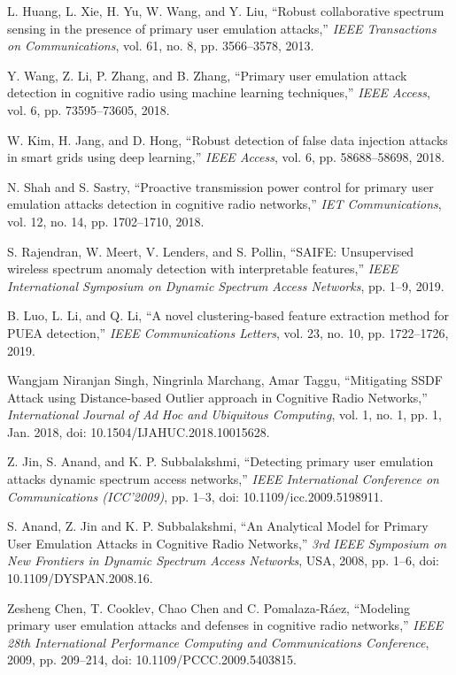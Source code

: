\documentclass[pdflatex,sn-mathphys-num]{sn-jnl}%
\theoremstyle{thmstyleone}
\theoremstyle{thmstyletwo}
\theoremstyle{thmstylethree}
\begin{document}
\begin{thebibliography}{25}
L. Huang, L. Xie, H. Yu, W. Wang, and Y. Liu, ``Robust collaborative spectrum sensing in the presence of primary user emulation attacks,'' \emph{IEEE Transactions on Communications}, vol. 61, no. 8, pp. 3566--3578, 2013.

Y. Wang, Z. Li, P. Zhang, and B. Zhang, ``Primary user emulation attack detection in cognitive radio using machine learning techniques,'' \emph{IEEE Access}, vol. 6, pp. 73595--73605, 2018.

W. Kim, H. Jang, and D. Hong, ``Robust detection of false data injection attacks in smart grids using deep learning,'' \emph{IEEE Access}, vol. 6, pp. 58688--58698, 2018.

N. Shah and S. Sastry, ``Proactive transmission power control for primary user emulation attacks detection in cognitive radio networks,'' \emph{IET Communications}, vol. 12, no. 14, pp. 1702--1710, 2018.

S. Rajendran, W. Meert, V. Lenders, and S. Pollin, ``SAIFE: Unsupervised wireless spectrum anomaly detection with interpretable features,'' \emph{IEEE International Symposium on Dynamic Spectrum Access Networks}, pp. 1--9, 2019.

B. Luo, L. Li, and Q. Li, ``A novel clustering-based feature extraction method for PUEA detection,'' \emph{IEEE Communications Letters}, vol. 23, no. 10, pp. 1722--1726, 2019.

Wangjam Niranjan Singh, Ningrinla Marchang, Amar Taggu, ``Mitigating SSDF Attack using Distance-based Outlier approach in Cognitive Radio Networks,'' \emph{International Journal of Ad Hoc and Ubiquitous Computing}, vol. 1, no. 1, pp. 1, Jan. 2018, doi: 10.1504/IJAHUC.2018.10015628.

Z. Jin, S. Anand, and K. P. Subbalakshmi, ``Detecting primary user emulation attacks dynamic spectrum access networks,'' \emph{IEEE International Conference on Communications (ICC'2009)}, pp. 1--3, doi: 10.1109/icc.2009.5198911.

S. Anand, Z. Jin and K. P. Subbalakshmi, ``An Analytical Model for Primary User Emulation Attacks in Cognitive Radio Networks,'' \emph{3rd IEEE Symposium on New Frontiers in Dynamic Spectrum Access Networks}, USA, 2008, pp. 1--6, doi: 10.1109/DYSPAN.2008.16.

Zesheng Chen, T. Cooklev, Chao Chen and C. Pomalaza-R\'aez, ``Modeling primary user emulation attacks and defenses in cognitive radio networks,'' \emph{IEEE 28th International Performance Computing and Communications Conference}, 2009, pp. 209--214, doi: 10.1109/PCCC.2009.5403815.


\end{thebibliography}
\end{document}
